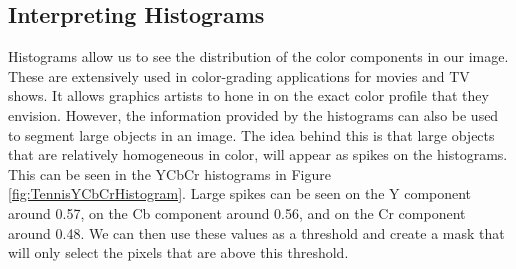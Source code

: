 \subsection{Interpreting Histograms}
\label{sec:SubSecInterpretingHistograms}
Histograms allow us to see the distribution of the color components in our image. These are extensively used in color-grading applications for movies and TV shows. It allows graphics artists to hone in on the exact color profile that they envision. However, the information provided by the histograms can also be used to segment large objects in an image. The idea behind this is that large objects that are relatively homogeneous in color, will appear as spikes on the histograms. This can be seen in the YCbCr histograms in Figure \ref{fig:TennisYCbCrHistogram}. Large spikes can be seen on the Y component around 0.57, on the Cb component around 0.56, and on the Cr component around 0.48. We can then use these values as a threshold and create a mask that will only select the pixels that are above this threshold.